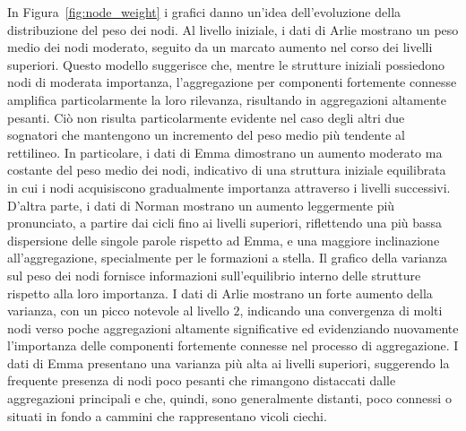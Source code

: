 In Figura~\ref{fig:node_weight} i grafici danno un'idea dell'evoluzione della distribuzione del peso dei nodi.
Al livello iniziale, i dati di Arlie mostrano un peso medio dei nodi moderato, seguito da un marcato aumento nel
corso dei livelli superiori.
Questo modello suggerisce che, mentre le strutture iniziali possiedono nodi di moderata importanza,
l'aggregazione per componenti fortemente connesse amplifica particolarmente la loro rilevanza, risultando in
aggregazioni altamente pesanti.
Ciò non risulta particolarmente evidente nel caso degli altri due sognatori che mantengono un incremento del peso
medio più tendente al rettilineo.
In particolare, i dati di Emma dimostrano un aumento moderato ma costante del peso medio dei nodi, indicativo di
una struttura iniziale equilibrata in cui i nodi acquisiscono gradualmente importanza attraverso i livelli successivi.
D'altra parte, i dati di Norman mostrano un aumento leggermente più pronunciato, a partire dai cicli fino ai
livelli superiori, riflettendo una più bassa dispersione delle singole parole rispetto ad Emma, e una maggiore
inclinazione all'aggregazione, specialmente per le formazioni a stella.
Il grafico della varianza sul peso dei nodi fornisce informazioni sull'equilibrio interno delle strutture rispetto
alla loro importanza.
I dati di Arlie mostrano un forte aumento della varianza, con un picco notevole al livello $2$, indicando una convergenza
di molti nodi verso poche aggregazioni altamente significative ed evidenziando nuovamente l'importanza delle componenti
fortemente connesse nel processo di aggregazione.
I dati di Emma presentano una varianza più alta ai livelli superiori, suggerendo la frequente presenza di nodi
poco pesanti che rimangono distaccati dalle aggregazioni principali e che, quindi, sono generalmente distanti, poco
connessi o situati in fondo a cammini che rappresentano vicoli ciechi.

\newpage


